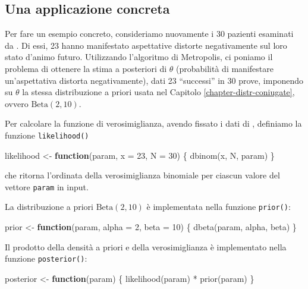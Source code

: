 \documentclass[
  11pt,
]{krantz}
\makeatletter
\newenvironment{Shaded}{\begin{snugshade}}{\end{snugshade}}
\newcommand{\AttributeTok}[1]{\textcolor[rgb]{0.61,0.61,0.61}{#1}}
\newcommand{\ControlFlowTok}[1]{\textcolor[rgb]{0.27,0.27,0.27}{\textbf{#1}}}
\newcommand{\DecValTok}[1]{\textcolor[rgb]{0.06,0.06,0.06}{#1}}
\newcommand{\FunctionTok}[1]{\textcolor[rgb]{0,0,0}{#1}}
\newcommand{\NormalTok}[1]{#1}
\newcommand{\OtherTok}[1]{\textcolor[rgb]{0.37,0.37,0.37}{#1}}
\newcommand{\SpecialCharTok}[1]{\textcolor[rgb]{0,0,0}{#1}}
\newenvironment{kframe}{%
\medskip{}
\setlength{\fboxsep}{.8em}
 \def\at@end@of@kframe{}%
 \ifinner\ifhmode%
  \def\at@end@of@kframe{\end{minipage}}%
  \begin{minipage}{\columnwidth}%
 \fi\fi%
 \def\FrameCommand##1{\hskip\@totalleftmargin \hskip-\fboxsep
 \colorbox{shadecolor}{##1}\hskip-\fboxsep
     \hskip-\linewidth \hskip-\@totalleftmargin \hskip\columnwidth}%
 \MakeFramed {\advance\hsize-\width
   \@totalleftmargin\z@ \linewidth\hsize
   \@setminipage}}%
 {\par\unskip\endMakeFramed%
 \at@end@of@kframe}
\renewenvironment{Shaded}{\begin{kframe}}{\end{kframe}}
\theoremstyle{definition}
\theoremstyle{definition}
\theoremstyle{definition}
\theoremstyle{definition}
\theoremstyle{remark}
\makeatother
\begin{document}
\hypertarget{una-applicazione-concreta}{%
\subsection{Una applicazione concreta}\label{una-applicazione-concreta}}

Per fare un esempio concreto, consideriamo nuovamente i 30 pazienti esaminati da \citet{zetschefuture2019}. Di essi, 23 hanno manifestato aspettative distorte negativamente sul loro stato d'animo futuro. Utilizzando l'algoritmo di Metropolis, ci poniamo il problema di ottenere la stima a posteriori di \(\theta\) (probabilità di manifestare un'aspettativa distorta negativamente), dati 23 ``successi'' in 30 prove, imponendo su \(\theta\) la stessa distribuzione a priori usata nel Capitolo \ref{chapter-distr-coniugate}, ovvero \(\mbox{Beta}(2, 10)\).

Per calcolare la funzione di verosimiglianza, avendo fissato i dati di \citet{zetschefuture2019}, definiamo la funzione \texttt{likelihood()}

\begin{Shaded}
\begin{Highlighting}[]
\NormalTok{likelihood }\OtherTok{\textless{}{-}} \ControlFlowTok{function}\NormalTok{(param, }\AttributeTok{x =} \DecValTok{23}\NormalTok{, }\AttributeTok{N =} \DecValTok{30}\NormalTok{) \{}
  \FunctionTok{dbinom}\NormalTok{(x, N, param)}
\NormalTok{\}}
\end{Highlighting}
\end{Shaded}

che ritorna l'ordinata della verosimiglianza binomiale per ciascun valore del vettore \texttt{param} in input.

La distribuzione a priori \(\mbox{Beta}(2, 10)\) è implementata nella funzione \texttt{prior()}:

\begin{Shaded}
\begin{Highlighting}[]
\NormalTok{prior }\OtherTok{\textless{}{-}} \ControlFlowTok{function}\NormalTok{(param, }\AttributeTok{alpha =} \DecValTok{2}\NormalTok{, }\AttributeTok{beta =} \DecValTok{10}\NormalTok{) \{}
  \FunctionTok{dbeta}\NormalTok{(param, alpha, beta) }
\NormalTok{\}}
\end{Highlighting}
\end{Shaded}

Il prodotto della densità a priori e della verosimiglianza è implementato nella funzione \texttt{posterior()}:

\begin{Shaded}
\begin{Highlighting}[]
\NormalTok{posterior }\OtherTok{\textless{}{-}} \ControlFlowTok{function}\NormalTok{(param) \{}
  \FunctionTok{likelihood}\NormalTok{(param) }\SpecialCharTok{*} \FunctionTok{prior}\NormalTok{(param)}
\NormalTok{\}}
\end{Highlighting}
\end{Shaded}
\end{document}
